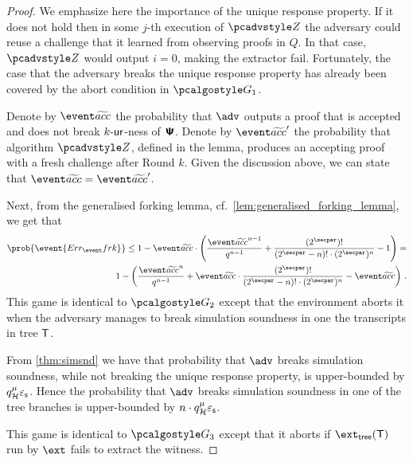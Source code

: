 \documentclass[runningheads,11pt]{llncs}
\begin{document}
\begin{proof}
We emphasize here the importance of the unique response property. If it does not
hold then in some $j$-th execution of $\zdv$ the adversary could reuse a
challenge that it learned from observing proofs in $Q$. In that case, $\zdv$
would output $i = 0$, making the extractor fail. Fortunately, the case that the
adversary breaks the unique response property has already been covered by the
abort condition in $\game{1}$.

Denote by $\waccProb$ the probability that $\advse$ outputs a proof that is
accepted and does not break ${k\text{-}\mathsf{ur}}$-ness of $\bm{\mathsf{\Psi}}$.  Denote by $\waccProb'$ the
probability that algorithm $\zdv$, defined in the lemma, produces an accepting
proof with a fresh challenge after Round $k$. Given the discussion above, we can
state that $\waccProb = \waccProb'$.

Next, from the generalised forking lemma, cf.~\cref{lem:generalised_forking_lemma}, we get that
\begin{equation}
  \begin{split}
    \prob{\event{\errfrk}} \leq 1 - \waccProb \cdot \left(\frac{\waccProb^{n -
          1}}{q^{n - 1}} + \frac{(2^\secpar) !}{(2^\secpar - n)! \cdot
        (2^\secpar)^{n}} - 1\right) = \\
    1 - \left(\frac{\waccProb^{n}}{q^{n - 1}} + 
      \waccProb \cdot \frac{(2^\secpar) !}{(2^\secpar - n)! \cdot
        (2^\secpar)^{n}} - \waccProb\right)\,.
\end{split}
\end{equation}
 This game is identical to $\game{2}$ except that the environment
aborts it when the adversary manages to break simulation soundness in one the
transcripts in tree $\mathsf{T}$.

From \cref{thm:simsnd} we have that probability that $\adv$ breaks simulation
soundness, while not breaking the unique response property, is upper-bounded by
$q_{\mathcal{H}}^{\mu} \varepsilon_{\mathsf{s}}$. Hence the probability that $\adv$ breaks simulation
soundness in one of the tree branches is upper-bounded by $n \cdot
q_{\mathcal{H}}^{\mu} \varepsilon_{\mathsf{s}}$.

 This game is identical to $\game{3}$ except that it aborts if
$\extt(\tree)$ run by $\ext$ fails to extract the witness. 


\end{proof}
\end{document}
